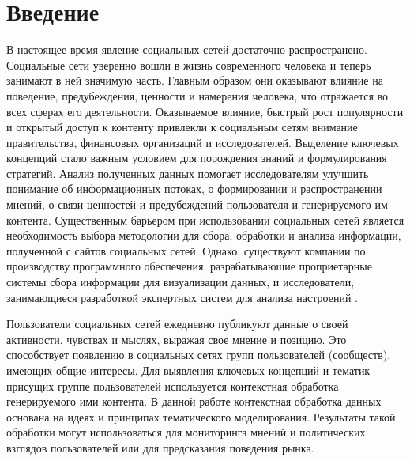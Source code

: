 \documentclass[a4paper]{report}
\begin{document}
	\section{Введение} 
	В настоящее время явление социальных сетей достаточно распространено. Социальные сети уверенно вошли в жизнь современного человека и теперь занимают в ней значимую часть. Главным образом они оказывают влияние на поведение, предубеждения, ценности и намерения человека, что отражается во всех сферах его деятельности. Оказываемое влияние, быстрый рост популярности и открытый доступ к контенту привлекли к социальным сетям внимание правительства, финансовых организаций и исследователей. 
	Выделение ключевых концепций стало важным условием для порождения знаний и формулирования стратегий. Анализ полученных данных помогает исследователям улучшить понимание об информационных потоках, о формировании и распространении мнений, о связи ценностей и предубеждений пользователя и генерируемого им контента. 
	Существенным барьером при использовании социальных сетей является необходимость выбора методологии для сбора, обработки и анализа информации, полученной с сайтов социальных сетей. Однако, существуют компании по производству программного обеспечения, разрабатывающие проприетарные системы сбора информации для визуализации данных, и исследователи, занимающиеся разработкой экспертных систем для анализа настроений \cite{bib:Kaklauskas}. 
	
Пользователи социальных сетей ежедневно публикуют данные о своей активности, чувствах и мыслях, выражая свое мнение и позицию. Это способствует появлению в социальных сетях групп пользователей (сообществ), имеющих общие интересы. Для выявления ключевых концепций и тематик присущих группе пользователей используется контекстная обработка  генерируемого ими контента. В данной работе контекстная обработка данных основана на идеях и принципах тематического моделирования. Результаты такой обработки могут использоваться для мониторинга мнений и политических взглядов пользователей или для предсказания поведения рынка. \\

	 
\end{document}
